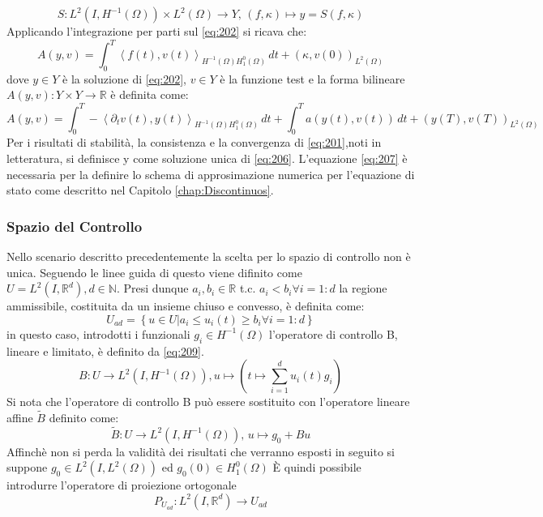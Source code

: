 \begin{equation}
S : L^2(I,{H^{-1}(\Omega)}) \times {L^{2}(\Omega)} \rightarrow Y \text{, } (f,\kappa) \longmapsto y = S(f,\kappa)
\label{eq:S}
\end{equation}
Applicando l'integrazione per parti sul \ref{eq:202} si ricava che:
\begin{equation}
A(y,v) = \int_{0}^{T} \left \langle f(t),v(t) \right \rangle_{{H^{-1}(\Omega)}{H^{0}_{1}(\Omega)}} \, dt + ({\kappa},v(0))_{L^{2}(\Omega)}
\label{eq:206}
\end{equation}
dove $y{\in}Y$ è la soluzione di \ref{eq:202}, $v{\in}Y$ è la funzione test e la forma bilineare $A(y,v): Y{\times}Y\rightarrow\mathbb{R}$ è definita come:
\begin{equation}
 A(y,v) = \int_{0}^{T} -\left \langle {\partial_{t}}v(t),y(t) \right \rangle_{{H^{-1}(\Omega)}{H^{0}_{1}(\Omega)}} \, dt + \int_{0}^{T} a(y(t),v(t)) \, dt + (y(T),v(T))_{L^{2}(\Omega)}
\label{eq:207}
\end{equation}
Per i risultati di stabilità, la consistenza e la convergenza di \ref{eq:201},noti in letteratura, si definisce y come soluzione unica di \ref{eq:206}. L'equazione \ref{eq:207} è necessaria per la definire  lo schema di approsimazione numerica per l'equazione di stato come descritto nel Capitolo \ref{chap:Discontinuos}.

\subsubsection{Spazio del Controllo}
Nello scenario descritto precedentemente la scelta per lo spazio di controllo non è unica. Seguendo le linee guida di \cite{MAIN} questo viene difinito come $U = L^2(I,\mathbb{R}^d), d \in \mathbb{N}$. Presi dunque $a_i, b_i \in \mathbb{R}$ t.c. $a_i<b_i {\forall}i=1:d$ la regione ammissibile, costituita da un insieme chiuso e convesso, è definita come:
\begin{equation}
U_{ad} = \left\{ u \in U | a_i \leq u_i(t) \geq b_i {\forall}i=1:d  \right\}
\label{eq:208}
\end{equation}
in questo caso, introdotti i funzionali $g_i \in {H^{-1}(\Omega)}$ l'operatore di controllo B, lineare e limitato, è definito da \ref{eq:209}.
\begin{equation}
B : U \rightarrow L^2(I,{H^{-1}(\Omega)}), u\mapsto \left( t\mapsto\sum_{i=1}^d u_i(t)g_i \right)
\label{eq:209}
\end{equation}
Si nota che l'operatore di controllo B può essere sostituito con l'operatore lineare affine $\tilde{B}$ definito come:
\begin{equation}
\tilde{B} : U \rightarrow L^2(I,{H^{-1}(\Omega)}) \text{, } u\mapsto g_0 + Bu
\label{eq:210}
\end{equation}
Affinchè non si perda la validità dei risultati che verranno esposti in seguito si suppone $g_0 \in L^2(I,{L^{2}(\Omega)})$ ed $g_0(0) \in {H^{0}_{1}(\Omega)}$
\MakeUppercase{è} quindi possibile introdurre l'operatore di proiezione ortogonale 
\begin{equation}
P_{U_{ad}} : L^2(I,\mathbb{R}^d)\rightarrow U_{ad}
\label{eq:211}
\end{equation}

